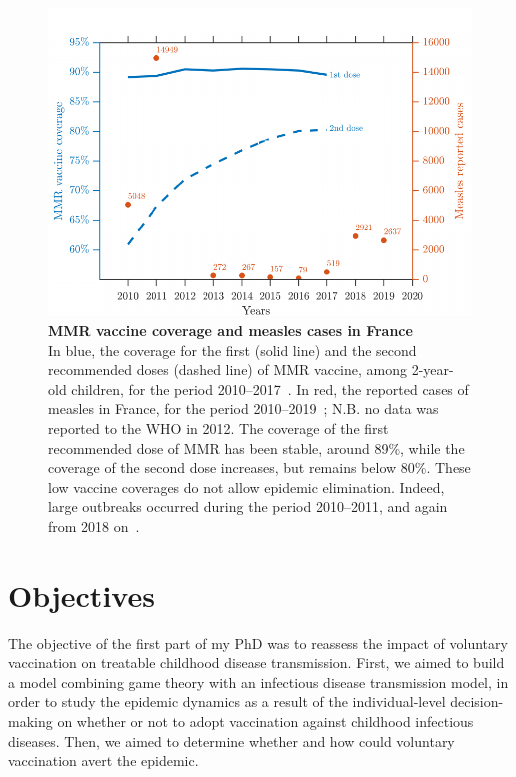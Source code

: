 
\begin{figure}[H]
	\centering
	\includegraphics{Figures/Vaccine/Measles_FR}
	\captionsetup{width=0.85\textwidth}
	\caption[MMR vaccine coverage and measles cases in France]{%
		{\bf MMR vaccine coverage and measles cases in France}\\
	In blue, the coverage for the first (solid line) and the second recommended doses (dashed line) of MMR vaccine, among 2-year-old children, for the period 2010--2017~\cite[]{SPF_CouvertureROR2019}. In red, the reported cases of measles in France, for the period 2010--2019~\cite[]{WHO_MeaslesFrance2020}; N.B. no data was reported to the WHO in 2012. The coverage of the first  recommended dose of MMR has been stable, around 89\%, while the coverage of the second dose increases, but remains below 80\%. These low vaccine coverages do not allow epidemic elimination. Indeed, large outbreaks occurred during the period 2010--2011, and again from 2018 on~\cite[]{WHO_MeaslesFrance2020}.}
	\label{fig:Measles_France}
\end{figure}



\section{Objectives}
\label{Vaccine:Objectives}
The objective of the first part of my PhD was to reassess the impact of voluntary vaccination on treatable childhood disease transmission. First, we aimed to build a model combining game theory with an infectious disease transmission model, in order to study the epidemic dynamics as a result of the individual-level decision-making on whether or not to adopt vaccination against childhood infectious diseases. Then, we aimed to determine whether and how could voluntary vaccination avert the epidemic.

